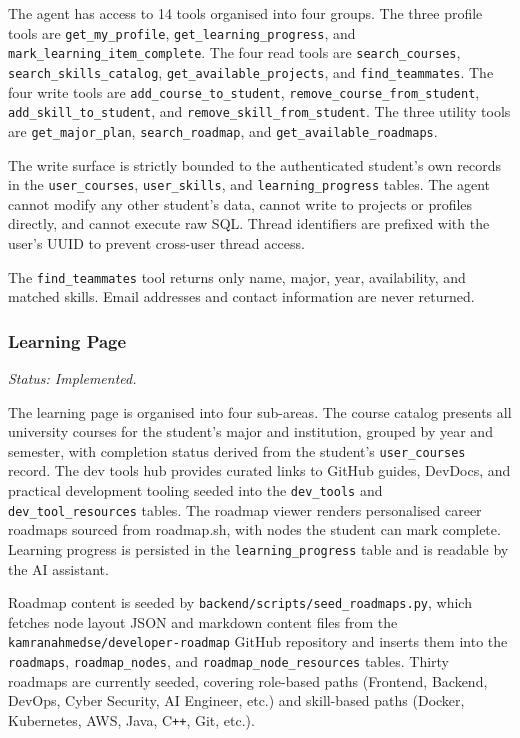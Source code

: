 \documentclass[12pt,a4paper]{article}
\begin{document}
The agent has access to 14 tools organised into four groups. The three profile tools are
\texttt{get\_my\_profile}, \texttt{get\_learning\_progress}, and
\texttt{mark\_learning\_item\_complete}. The four read tools are \texttt{search\_courses},
\texttt{search\_skills\_catalog}, \texttt{get\_available\_projects}, and
\texttt{find\_teammates}. The four write tools are \texttt{add\_course\_to\_student},
\texttt{remove\_course\_from\_student}, \texttt{add\_skill\_to\_student}, and
\texttt{remove\_skill\_from\_student}. The three utility tools are \texttt{get\_major\_plan},
\texttt{search\_roadmap}, and \texttt{get\_available\_roadmaps}.

The write surface is strictly bounded to the authenticated student's own records in the
\texttt{user\_courses}, \texttt{user\_skills}, and \texttt{learning\_progress} tables.
The agent cannot modify any other student's data, cannot write to projects or profiles
directly, and cannot execute raw SQL. Thread identifiers are prefixed with the user's UUID
to prevent cross-user thread access.

The \texttt{find\_teammates} tool returns only name, major, year, availability, and
matched skills. Email addresses and contact information are never returned.

\subsubsection{Learning Page}

\textit{Status: Implemented.}

The learning page is organised into four sub-areas. The course catalog presents all
university courses for the student's major and institution, grouped by year and semester,
with completion status derived from the student's \texttt{user\_courses} record. The dev
tools hub provides curated links to GitHub guides, DevDocs, and practical development
tooling seeded into the \texttt{dev\_tools} and \texttt{dev\_tool\_resources} tables. The
roadmap viewer renders personalised career roadmaps sourced from roadmap.sh, with nodes
the student can mark complete. Learning progress is persisted in the
\texttt{learning\_progress} table and is readable by the AI assistant.

Roadmap content is seeded by \texttt{backend/scripts/seed\_roadmaps.py}, which fetches
node layout JSON and markdown content files from the
\texttt{kamranahmedse/developer-roadmap} GitHub repository and inserts them into the
\texttt{roadmaps}, \texttt{roadmap\_nodes}, and \texttt{roadmap\_node\_resources} tables.
Thirty roadmaps are currently seeded, covering role-based paths (Frontend, Backend,
DevOps, Cyber Security, AI Engineer, etc.) and skill-based paths (Docker, Kubernetes,
AWS, Java, C\texttt{++}, Git, etc.).
\end{document}
